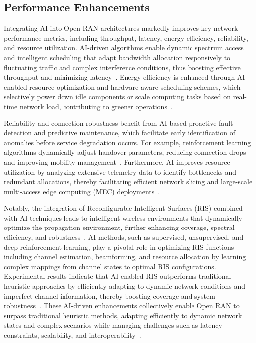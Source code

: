 \documentclass[sigconf]{acmart}
\begin{document}
\subsection{Performance Enhancements}

Integrating AI into Open RAN architectures markedly improves key network performance metrics, including throughput, latency, energy efficiency, reliability, and resource utilization. AI-driven algorithms enable dynamic spectrum access and intelligent scheduling that adapt bandwidth allocation responsively to fluctuating traffic and complex interference conditions, thus boosting effective throughput and minimizing latency~\cite{ref54}. Energy efficiency is enhanced through AI-enabled resource optimization and hardware-aware scheduling schemes, which selectively power down idle components or scale computing tasks based on real-time network load, contributing to greener operations~\cite{ref49}.

Reliability and connection robustness benefit from AI-based proactive fault detection and predictive maintenance, which facilitate early identification of anomalies before service degradation occurs. For example, reinforcement learning algorithms dynamically adjust handover parameters, reducing connection drops and improving mobility management~\cite{ref54}. Furthermore, AI improves resource utilization by analyzing extensive telemetry data to identify bottlenecks and redundant allocations, thereby facilitating efficient network slicing and large-scale multi-access edge computing (MEC) deployments~\cite{ref49}.

Notably, the integration of Reconfigurable Intelligent Surfaces (RIS) combined with AI techniques leads to intelligent wireless environments that dynamically optimize the propagation environment, further enhancing coverage, spectral efficiency, and robustness~\cite{ref49}. AI methods, such as supervised, unsupervised, and deep reinforcement learning, play a pivotal role in optimizing RIS functions including channel estimation, beamforming, and resource allocation by learning complex mappings from channel states to optimal RIS configurations. Experimental results indicate that AI-enabled RIS outperforms traditional heuristic approaches by efficiently adapting to dynamic network conditions and imperfect channel information, thereby boosting coverage and system robustness~\cite{ref49}. These AI-driven enhancements collectively enable Open RAN to surpass traditional heuristic methods, adapting efficiently to dynamic network states and complex scenarios while managing challenges such as latency constraints, scalability, and interoperability~\cite{ref54}.
\end{document}
